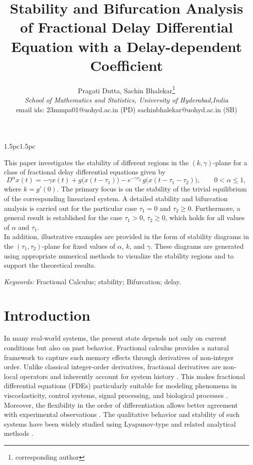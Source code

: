 \documentclass[11pt]{article}
\title{\textbf{Stability and Bifurcation Analysis of Fractional Delay Differential Equation with a Delay-dependent Coefficient}}
\author{  Pragati Dutta, Sachin Bhalekar\footnote{corresponding author}\\
	\textit{School of Mathematics and Statistics, University of Hyderabad,India}\\
	email ids: 23mmpa01@uohyd.ac.in (PD)
	sachinbhalekar@uohyd.ac.in (SB)}
\date{}
\renewenvironment{abstract}{%
	\begin{center}%
		\normalfont\fontsize{10pt}{12pt}\selectfont
		\begin{adjustwidth}{1.5pc}{1.5pc} %
		}{%
		\end{adjustwidth}%
	\end{center}%
}
\theoremstyle{remark}
\begin{document}
	\maketitle
	
	\begin{abstract}
	This paper investigates the stability of different regions in the $(k,\gamma)$-plane for a class of fractional delay differential equations given by
	\begin{equation}
		D^{\alpha} x(t)
		= -\gamma x(t)
		+ g\big(x(t - \tau_1)\big)
		- e^{-\gamma \tau_2}\, g\big(x(t - \tau_1 - \tau_2)\big),
		\qquad 0 < \alpha \le 1,
	\end{equation}
	where $k = g'(0)$. The primary focus is on the stability of the trivial equilibrium of the corresponding linearized system. A detailed stability and bifurcation analysis is carried out for the particular case $\tau_1 = 0$ and $\tau_2 \ge 0$. Furthermore, a general result is established for the case $\tau_1 > 0$, $\tau_2 \ge 0$, which holds for all values of $\alpha$ and $\tau_1$.\\
	In addition, illustrative examples are provided in the form of stability diagrams in the $(\tau_1,\tau_2)$-plane for fixed values of $\alpha$, $k$, and $\gamma$. These diagrams are generated using appropriate numerical methods to visualize the stability regions and to support the theoretical results.
		\end{abstract}
	
	\textit{Keywords:} Fractional Calculus; stability; Bifurcation; delay.

\section{Introduction}

In many real-world systems, the present state depends not only on current conditions but also on past behavior. Fractional calculus provides a natural framework to capture such memory effects through derivatives of non-integer order. Unlike classical integer-order derivatives, fractional derivatives are non-local operators and inherently account for system history \cite{podlubny1998fractional,kilbas2006theory}. This makes fractional differential equations (FDEs) particularly suitable for modeling phenomena in viscoelasticity, control systems, signal processing, and biological processes \cite{diethelm2010analysis,oldham1974j,mainardi2022fractional}. Moreover, the flexibility in the order of differentiation allows better agreement with experimental observations \cite{bagley1983theoretical,Podlubny1999}. The qualitative behavior and stability of such systems have been widely studied using Lyapunov-type and related analytical methods \cite{agarwal2016stability}.
\end{document}
